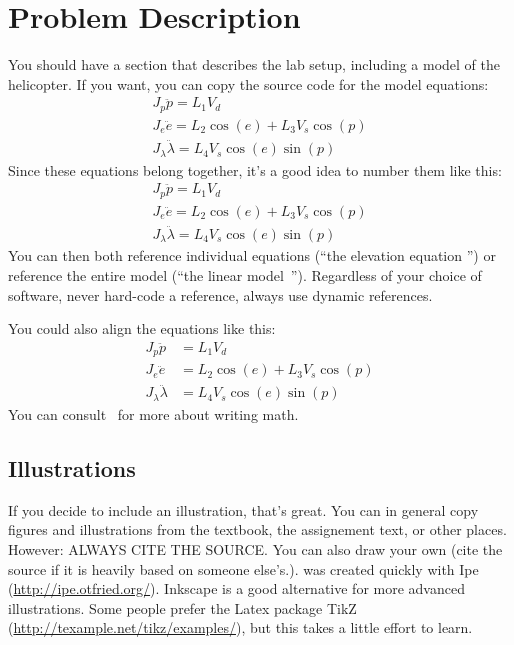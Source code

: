 \section{Problem Description}\label{sec:prob_descr}
You should have a section that describes the lab setup, including a model of the helicopter. If you want, you can copy the source code for the model equations:
\begin{gather}
		J_p\ddot{p} = L_{1}V_{d} \label{eq:model_pitch}\\
		J_e\ddot{e} = L_{2} \cos(e) + L_3 V_s \cos(p) \label{eq:model_elev}\\
		J_\lambda \ddot{\lambda} = L_4 V_s \cos(e) \sin(p) \label{eq:model_lambda}
\end{gather}
Since these equations belong together, it's a good idea to number them like this:
\begin{subequations}\label{eq:model}
	\begin{gather}
		J_p\ddot{p} = L_{1}V_{d} \label{eq:model_se_pitch}\\
		J_e\ddot{e} = L_{2} \cos(e) + L_3 V_s \cos(p) \label{eq:model_se_elev}\\
		J_\lambda \ddot{\lambda} = L_4 V_s \cos(e) \sin(p) \label{eq:model_se_lambda}
	\end{gather}
\end{subequations}
You can then both reference individual equations (``the elevation equation '') or reference the entire model (``the linear model~''). Regardless of your choice of software, never hard-code a reference, always use dynamic references. 

You could also align the equations like this:
\begin{subequations}\label{eq:model_al}
	\begin{align}
		J_p\ddot{p} &= L_{1}V_{d} \label{eq:model_se_al_pitch}\\
		J_e\ddot{e} &= L_{2} \cos(e) + L_3 V_s \cos(p) \label{eq:model_se_al_elev}\\
		J_\lambda \ddot{\lambda} &= L_4 V_s \cos(e) \sin(p) \label{eq:model_se_al_lambda}
	\end{align}
\end{subequations}
You can consult~\cite{Downes2002} for more about writing math.


\subsection{Illustrations}
If you decide to include an illustration, that's great. You can in general copy figures and illustrations from the textbook, the assignement text, or other places. However: ALWAYS CITE THE SOURCE\@. You can also draw your own (cite the source if it is heavily based on someone else's.).  was created quickly with Ipe (\url{http://ipe.otfried.org/}). Inkscape is a good alternative for more advanced illustrations. Some people prefer the Latex package TikZ (\url{http://texample.net/tikz/examples/}), but this takes a little effort to learn.

